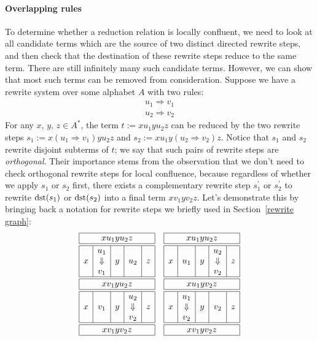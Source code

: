 \documentclass[../generics]{subfiles}
\begin{document}
\paragraph{Overlapping rules} To determine whether a reduction relation is locally confluent, we need to look at all candidate terms which are the source of two distinct directed rewrite steps, and then check that the destination of these rewrite steps reduce to the same term. There are still infinitely many such candidate terms. However, we can show that most such terms can be removed from consideration. Suppose we have a rewrite system over some alphabet $A$ with two rules:
\begin{gather*}
u_1\Rightarrow v_1\\
u_2\Rightarrow v_2
\end{gather*}
For any $x$, $y$, $z\in A^*$, the term $t := xu_1yu_2z$ can be reduced by the two rewrite steps $s_1 := x(u_1\Rightarrow v_1)yu_2z$ and $s_2 := xu_1y(u_2\Rightarrow v_2)z$. Notice that $s_1$ and $s_2$ rewrite disjoint subterms of $t$; we say that such pairs of rewrite steps are \emph{orthogonal}. Their importance stems from the observation that we don't need to check orthogonal rewrite steps for local confluence, because regardless of whether we apply $s_1$ or $s_2$ first, there exists a complementary rewrite step $s_1^\prime$ or $s_2^\prime$ to rewrite $\operatorname{dst}(s_1)$ or $\operatorname{dst}(s_2)$ into a final term $xv_1yv_2z$. Let's demonstrate this by bringing back a notation for rewrite steps we briefly used in Section~\ref{rewrite graph}:
\[
\begin{array}{cc}
\begin{array}{|c|c|c|c|c|}
\hline
\multicolumn{5}{|c|}{xu_1yu_2z}\\
\hline
\hline
&u_1&&&\\
x&\Downarrow&y&u_2&z\\
&v_1&&&\\
\hline
\hline
\multicolumn{5}{|c|}{xv_1yu_2z}\\
\hline
\hline
&&&u_2&\\
x&v_1&y&\Downarrow&z\\
&&&v_2&\\
\hline
\hline
\multicolumn{5}{|c|}{xv_1yv_2z}\\
\hline
\end{array}
&
\begin{array}{|c|c|c|c|c|}
\hline
\multicolumn{5}{|c|}{xu_1yu_2z}\\
\hline
\hline
&&&u_2&\\
x&u_1&y&\Downarrow&z\\
&&&v_2&\\
\hline
\hline
\multicolumn{5}{|c|}{xu_1yv_2z}\\
\hline
\hline
&u_1&&&\\
x&\Downarrow&y&v_2&z\\
&v_2&&&\\
\hline
\hline
\multicolumn{5}{|c|}{xv_1yv_2z}\\
\hline
\end{array}
\end{array}
\]
\end{document}
